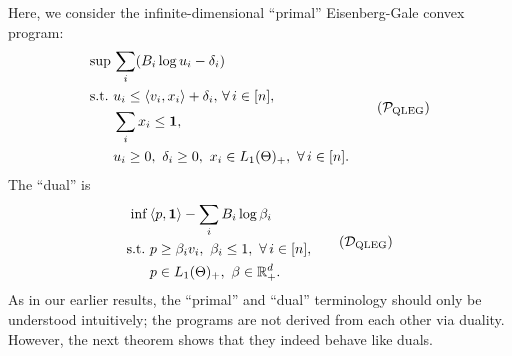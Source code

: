 Here, we consider the infinite-dimensional ``primal'' Eisenberg-Gale convex program:
\begin{align}
    \begin{split}
    \sup\, & \sum_i (B_i \log u_i - \delta_i) \\ 
    \st & u_i \leq \langle v_i, x_i \rangle + \delta_i,\, \forall\, i \in [n], \\
    & \sum_i x_i \leq \ones,\,  \\
    & u_i \geq 0,\ \delta_i \geq 0,\ x_i \in L_1(\Theta)_+,\ \forall\, i \in [n].
    \end{split}
    \label{eq:ql-eg-primal} 
    \tag{$\mathcal P_{\rm QLEG}$}
\end{align}
The ``dual'' is
\begin{align}
    \begin{split}
        \inf\, & \langle p, \ones \rangle - \sum_i B_i \log \beta_i \\
        \st & p \geq \beta_i v_i,\ \beta_i \leq 1,\ \forall\, i \in [n], \\
        & p \in L_1(\Theta)_+,\ \beta\in \RR^d_+.
    \end{split} 
    \label{eq:ql-eg-dual-p-beta}
    \tag{$\mathcal D_{\rm QLEG}$}
\end{align}
As in our earlier results, the ``primal'' and ``dual'' terminology should only be understood intuitively; the programs are not derived from each other via duality. However, the next theorem shows that they indeed behave like duals.
